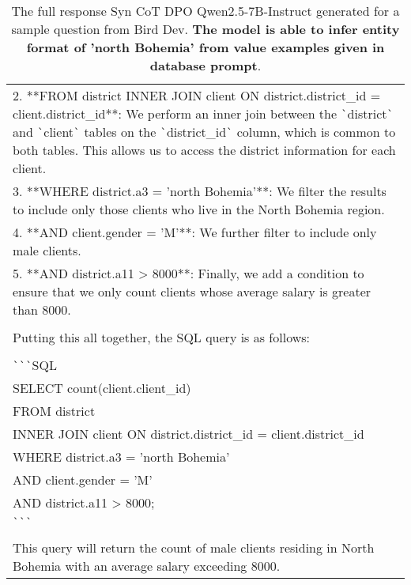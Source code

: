 \begin{table*}[htbp]
\begin{tcolorbox}[
    colback=white, %
    colframe=black, %
    title=Response, %
    fonttitle=\bfseries, %
    width=\textwidth, %
    boxrule=1pt, %
    rounded corners, %
]
\begin{tabularx}{\textwidth}{X}
2. **FROM district INNER JOIN client ON district.district\_id = client.district\_id**: We perform an inner join between the \verb|`|district\verb|`| and \verb|`|client\verb|`| tables on the \verb|`|district\_id\verb|`| column, which is common to both tables. This allows us to access the district information for each client. \\

3. **WHERE district.a3 = 'north Bohemia'**: We filter the results to include only those clients who live in the North Bohemia region. \\

4. **AND client.gender = 'M'**: We further filter to include only male clients. \\

5. **AND district.a11 > 8000**: Finally, we add a condition to ensure that we only count clients whose average salary is greater than 8000. 
\\ \\
Putting this all together, the SQL query is as follows:
\\ \\ 
\verb|`|\verb|`|\verb|`|SQL \\
SELECT count(client.client\_id) \\ 
FROM district \\
INNER JOIN client ON district.district\_id = client.district\_id \\
WHERE district.a3 = 'north Bohemia' \\
AND client.gender = 'M' \\
AND district.a11 > 8000; \\
\verb|`|\verb|`|\verb|`| 
\\ \\
This query will return the count of male clients residing in North Bohemia with an average salary exceeding 8000.

\end{tabularx}
\end{tcolorbox}
\caption{The full response Syn CoT DPO Qwen2.5-7B-Instruct generated for a sample question from Bird Dev. \textbf{The model is able to infer entity format of 'north Bohemia' from value examples given in database prompt}.}
\label{tab:cotResponseDPO}
\end{table*}